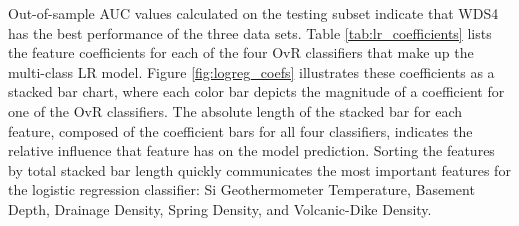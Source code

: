 Out-of-sample AUC values calculated on the testing subset indicate that WDS4 has the best performance of the three data sets. Table \ref{tab:lr_coefficients} lists the feature coefficients for each of the four OvR classifiers that make up the multi-class LR model. Figure \ref{fig:logreg_coefs} illustrates these coefficients as a stacked bar chart, where each color bar depicts the magnitude of a coefficient for one of the OvR classifiers. The absolute length of the stacked bar for each feature, composed of the coefficient bars for all four classifiers, indicates the relative influence that feature has on the model prediction. Sorting the features by total stacked bar length quickly communicates the most important features for the logistic regression classifier: Si Geothermometer Temperature, Basement Depth, Drainage Density, Spring Density, and Volcanic-Dike Density.
